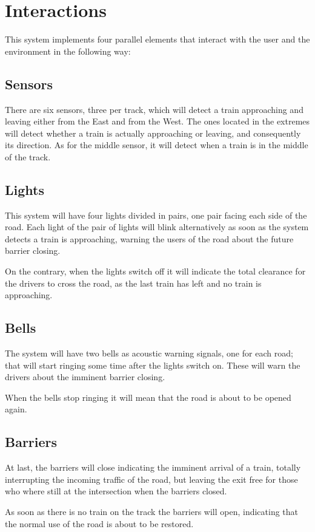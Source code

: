 \documentclass[final]{report}
\begin{document}
\chapter{Interactions}
This system implements four parallel elements that interact with the user and the environment in the following way: 

\section{Sensors}
There are six sensors, three per track, which will detect a train approaching and leaving either from the East and from the West. 
The ones located in the extremes will detect whether a train is actually approaching or leaving, and consequently its direction. 
As for the middle sensor, it will detect when a train is in the middle of the track.

\section{Lights}
This system will have four lights divided in pairs, one pair facing each side of the road.
Each light of the pair of lights will blink alternatively as soon as the system detects a train is approaching, warning the users of the road about the future barrier closing.

On the contrary, when the lights switch off it will indicate the total clearance for the drivers to cross the road, as the last train has left and no train is approaching.

\section{Bells}
The system will have two bells as acoustic warning signals, one for each road; that will start ringing some time after the lights switch on.
These will warn the drivers about the imminent barrier closing.

When the bells stop ringing it will mean that the road is about to be opened again. 
 

\section{Barriers}
At last, the barriers will close indicating the imminent arrival of a train, totally interrupting the incoming traffic of the road, but leaving the exit free for those who where still at the intersection when the barriers closed.

As soon as there is no train on the track the barriers will open, indicating that the normal use of the road is about to be restored.
\end{document}
